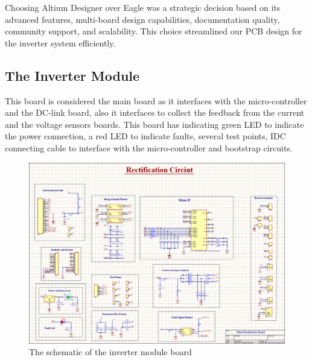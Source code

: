 \documentclass[12pt,a4paper]{book}
\begin{document}
Choosing Altium Designer over Eagle was a strategic decision based on its advanced features, multi-board design capabilities, documentation quality, community support, and scalability. This choice streamlined our PCB design for the inverter system efficiently.

\subsection{The Inverter Module}
This board is considered the main board as it interfaces with the micro-controller and the DC-link board, also it interfaces to collect the feedback from the current and the voltage sensors boards. This board has indicating green LED to indicate the power connection, a red LED to indicate faults, several test points, IDC connecting cable to interface with the micro-controller and bootstrap circuits.
\begin{figure}[ht]
  \centering
  \includegraphics[width = 15cm]{image30.png}
  \caption{The schematic of the inverter module board}
  \label{fig:image30}
\end{figure}
\end{document}
